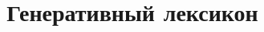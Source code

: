 \documentclass{beamer}
\begin{document}
\title{\Large{Генеративный лексикон}}
\author{}
\institute{}
\date{} 

\begin{frame}
    \thispagestyle{empty}
    \titlepage
\end{frame}


%
%
\end{document}

